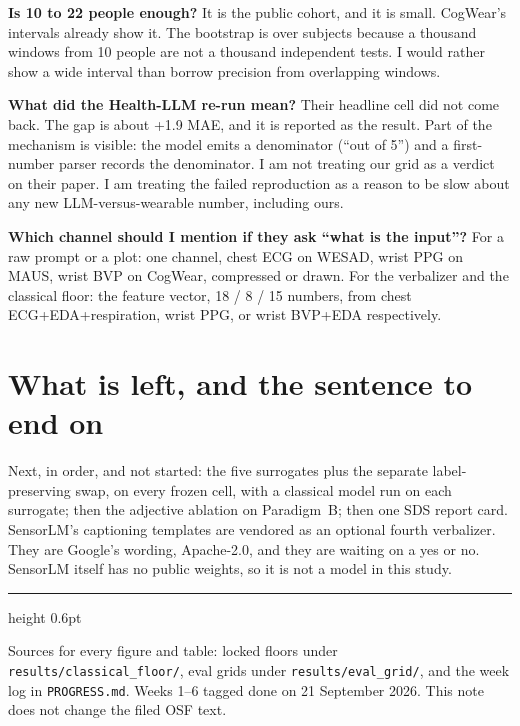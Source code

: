 \documentclass[11pt]{article}
\newcommand{\say}[1]{{\color{Ask}\textbf{#1}}}
\begin{document}
\say{Is 10 to 22 people enough?}
It is the public cohort, and it is small. CogWear's intervals already show it. The bootstrap is over subjects because a thousand windows from 10 people are not a thousand independent tests. I would rather show a wide interval than borrow precision from overlapping windows.

\say{What did the Health-LLM re-run mean?}
Their headline cell did not come back. The gap is about +1.9 MAE, and it is reported as the result. Part of the mechanism is visible: the model emits a denominator (``out of 5'') and a first-number parser records the denominator. I am not treating our grid as a verdict on their paper. I am treating the failed reproduction as a reason to be slow about any new LLM-versus-wearable number, including ours.

\say{Which channel should I mention if they ask ``what is the input''?}
For a raw prompt or a plot: one channel, chest ECG on WESAD, wrist PPG on MAUS, wrist BVP on CogWear, compressed or drawn. For the verbalizer and the classical floor: the feature vector, 18 / 8 / 15 numbers, from chest ECG+EDA+respiration, wrist PPG, or wrist BVP+EDA respectively.

\section{What is left, and the sentence to end on}

Next, in order, and not started: the five surrogates plus the separate label-preserving swap, on every frozen cell, with a classical model run on each surrogate; then the adjective ablation on Paradigm~B; then one SDS report card. SensorLM's captioning templates are vendored as an optional fourth verbalizer. They are Google's wording, Apache-2.0, and they are waiting on a yes or no. SensorLM itself has no public weights, so it is not a model in this study.

\vspace{0.25em}
\noindent{}

\vspace{0.8em}
{\color{Accent}\hrule height 0.6pt}
\vspace{0.35em}
{\small\color{AccentSoft}
Sources for every figure and table: locked floors under \texttt{results/classical\_floor/}, eval grids under \texttt{results/eval\_grid/}, and the week log in \texttt{PROGRESS.md}. Weeks 1--6 tagged done on 21 September 2026. This note does not change the filed OSF text.
\par}
\end{document}
